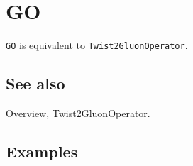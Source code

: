 \documentclass[../FeynCalcManual.tex]{subfiles}
\begin{document}
\hypertarget{go}{
\section{GO}\label{go}}

\texttt{GO} is equivalent to \texttt{Twist2GluonOperator}.

\subsection{See also}

\hyperlink{toc}{Overview},
\hyperlink{twist2gluonoperator}{Twist2GluonOperator}.

\subsection{Examples}
\end{document}
